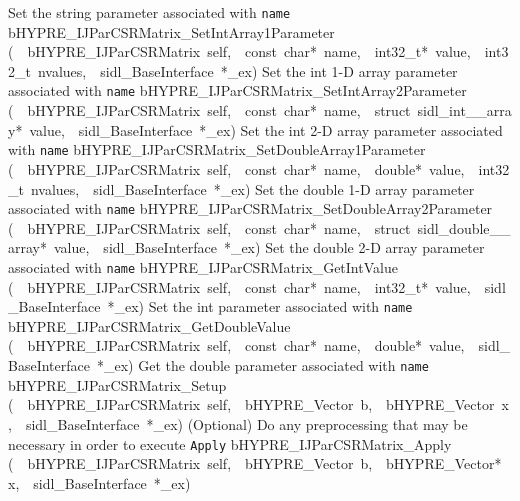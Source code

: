 \documentclass{article}
\begin{document}
\begin{cxxentry}
\begin{cxxentry}
\begin{cxxnames}
        {
Set the string parameter associated with {\tt name}}
        {}
\label{cxx.4.1.26}
        {bHYPRE\_IJParCSRMatrix\_SetIntArray1Parameter}
        {(\ \ bHYPRE\_IJParCSRMatrix\ self,\ \ const\ char*\ name,\ \ int32\_t*\ value,\ \ int32\_t\ nvalues,\ \ sidl\_BaseInterface\ *\_ex)}
        {
Set the int 1-D array parameter associated with {\tt name}}
        {}
\label{cxx.4.1.27}
        {bHYPRE\_IJParCSRMatrix\_SetIntArray2Parameter}
        {(\ \ bHYPRE\_IJParCSRMatrix\ self,\ \ const\ char*\ name,\ \ struct\ sidl\_int\_\_array*\ value,\ \ sidl\_BaseInterface\ *\_ex)}
        {
Set the int 2-D array parameter associated with {\tt name}}
        {}
\label{cxx.4.1.28}
        {bHYPRE\_IJParCSRMatrix\_SetDoubleArray1Parameter}
        {(\ \ bHYPRE\_IJParCSRMatrix\ self,\ \ const\ char*\ name,\ \ double*\ value,\ \ int32\_t\ nvalues,\ \ sidl\_BaseInterface\ *\_ex)}
        {
Set the double 1-D array parameter associated with {\tt name}}
        {}
\label{cxx.4.1.29}
        {bHYPRE\_IJParCSRMatrix\_SetDoubleArray2Parameter}
        {(\ \ bHYPRE\_IJParCSRMatrix\ self,\ \ const\ char*\ name,\ \ struct\ sidl\_double\_\_array*\ value,\ \ sidl\_BaseInterface\ *\_ex)}
        {
Set the double 2-D array parameter associated with {\tt name}}
        {}
\label{cxx.4.1.30}
        {bHYPRE\_IJParCSRMatrix\_GetIntValue}
        {(\ \ bHYPRE\_IJParCSRMatrix\ self,\ \ const\ char*\ name,\ \ int32\_t*\ value,\ \ sidl\_BaseInterface\ *\_ex)}
        {
Set the int parameter associated with {\tt name}}
        {}
\label{cxx.4.1.31}
        {bHYPRE\_IJParCSRMatrix\_GetDoubleValue}
        {(\ \ bHYPRE\_IJParCSRMatrix\ self,\ \ const\ char*\ name,\ \ double*\ value,\ \ sidl\_BaseInterface\ *\_ex)}
        {
Get the double parameter associated with {\tt name}}
        {}
\label{cxx.4.1.32}
        {bHYPRE\_IJParCSRMatrix\_Setup}
        {(\ \ bHYPRE\_IJParCSRMatrix\ self,\ \ bHYPRE\_Vector\ b,\ \ bHYPRE\_Vector\ x,\ \ sidl\_BaseInterface\ *\_ex)}
        {
(Optional) Do any preprocessing that may be necessary in
order to execute {\tt Apply}}
        {}
\label{cxx.4.1.33}
        {bHYPRE\_IJParCSRMatrix\_Apply}
        {(\ \ bHYPRE\_IJParCSRMatrix\ self,\ \ bHYPRE\_Vector\ b,\ \ bHYPRE\_Vector*\ x,\ \ sidl\_BaseInterface\ *\_ex)}

\end{cxxnames}
\end{cxxentry}
\end{cxxentry}
\end{document}
